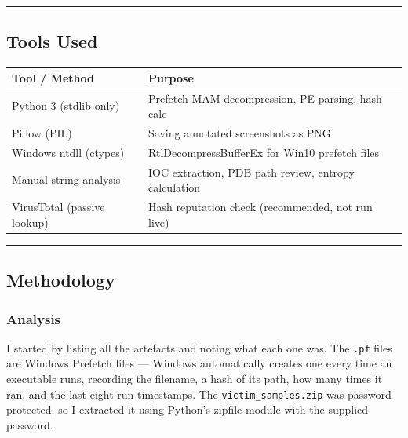 \documentclass[
]{article}
\begin{document}
\begin{center}\rule{0.5\linewidth}{0.5pt}\end{center}

\subsection{Tools Used}\label{tools-used}

\begin{longtable}[]{@{}
  >{\raggedright\arraybackslash}p{}
  >{\raggedright\arraybackslash}p{}@{}}
\toprule\noalign{}
\begin{minipage}[b]{\linewidth}\raggedright
Tool / Method
\end{minipage} & \begin{minipage}[b]{\linewidth}\raggedright
Purpose
\end{minipage} \\
\midrule\noalign{}
\endhead
\bottomrule\noalign{}
\endlastfoot
Python 3 (stdlib only) & Prefetch MAM decompression, PE parsing, hash
calc \\
Pillow (PIL) & Saving annotated screenshots as PNG \\
Windows ntdll (ctypes) & RtlDecompressBufferEx for Win10 prefetch
files \\
Manual string analysis & IOC extraction, PDB path review, entropy
calculation \\
VirusTotal (passive lookup) & Hash reputation check (recommended, not
run live) \\
\end{longtable}

\begin{center}\rule{0.5\linewidth}{0.5pt}\end{center}

\subsection{Methodology}\label{methodology}

\subsubsection{Analysis}\label{analysis}

I started by listing all the artefacts and noting what each one was. The
\texttt{.pf} files are Windows Prefetch files --- Windows automatically
creates one every time an executable runs, recording the filename, a
hash of its path, how many times it ran, and the last eight run
timestamps. The \texttt{victim\_samples.zip} was password-protected, so
I extracted it using Python's zipfile module with the supplied password.
\end{document}
